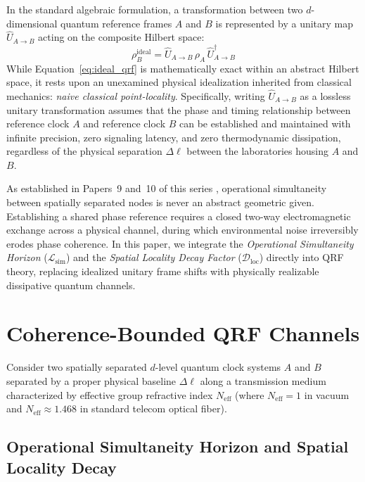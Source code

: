 \documentclass[11pt,a4paper]{article}
\begin{document}
In the standard algebraic formulation, a transformation between two $d$-dimensional quantum reference frames $A$ and $B$ is represented by a unitary map $\hat{U}_{A \to B}$ acting on the composite Hilbert space:
\begin{equation}
    \rho_B^{\mathrm{ideal}} = \hat{U}_{A \to B} \, \rho_A \, \hat{U}_{A \to B}^\dagger
    \label{eq:ideal_qrf}
\end{equation}
While Equation~\eqref{eq:ideal_qrf} is mathematically exact within an abstract Hilbert space, it rests upon an unexamined physical idealization inherited from classical mechanics: \textit{naive classical point-locality}. Specifically, writing $\hat{U}_{A \to B}$ as a lossless unitary transformation assumes that the phase and timing relationship between reference clock $A$ and reference clock $B$ can be established and maintained with infinite precision, zero signaling latency, and zero thermodynamic dissipation, regardless of the physical separation $\Delta\ell$ between the laboratories housing $A$ and $B$.

As established in Papers~9 and~10 of this series \cite{damasio_p9,damasio_p10}, operational simultaneity between spatially separated nodes is never an abstract geometric given. Establishing a shared phase reference requires a closed two-way electromagnetic exchange across a physical channel, during which environmental noise irreversibly erodes phase coherence. In this paper, we integrate the \textit{Operational Simultaneity Horizon} ($\mathcal{L}_{\mathrm{sim}}$) and the \textit{Spatial Locality Decay Factor} ($\mathcal{D}_{\mathrm{loc}}$) directly into QRF theory, replacing idealized unitary frame shifts with physically realizable dissipative quantum channels.

\section{Coherence-Bounded QRF Channels}

Consider two spatially separated $d$-level quantum clock systems $A$ and $B$ separated by a proper physical baseline $\Delta\ell$ along a transmission medium characterized by effective group refractive index $N_{\mathrm{eff}}$ (where $N_{\mathrm{eff}} = 1$ in vacuum and $N_{\mathrm{eff}} \approx 1.468$ in standard telecom optical fiber).

\subsection{Operational Simultaneity Horizon and Spatial Locality Decay}
\end{document}

